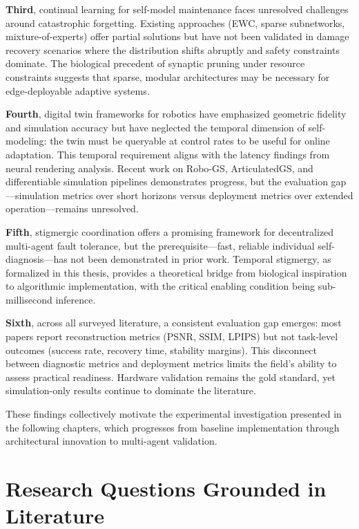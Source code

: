 \documentclass[12pt,a4paper,oneside]{report}
\begin{document}
\textbf{Third}, continual learning for self-model maintenance faces unresolved challenges around catastrophic forgetting. Existing approaches (EWC, sparse subnetworks, mixture-of-experts) offer partial solutions but have not been validated in damage recovery scenarios where the distribution shifts abruptly and safety constraints dominate. The biological precedent of synaptic pruning under resource constraints suggests that sparse, modular architectures may be necessary for edge-deployable adaptive systems.

\textbf{Fourth}, digital twin frameworks for robotics have emphasized geometric fidelity and simulation accuracy but have neglected the temporal dimension of self-modeling: the twin must be queryable at control rates to be useful for online adaptation. This temporal requirement aligns with the latency findings from neural rendering analysis. Recent work on Robo-GS, ArticulatedGS, and differentiable simulation pipelines demonstrates progress, but the evaluation gap---simulation metrics over short horizons versus deployment metrics over extended operation---remains unresolved.

\textbf{Fifth}, stigmergic coordination offers a promising framework for decentralized multi-agent fault tolerance, but the prerequisite---fast, reliable individual self-diagnosis---has not been demonstrated in prior work. Temporal stigmergy, as formalized in this thesis, provides a theoretical bridge from biological inspiration to algorithmic implementation, with the critical enabling condition being sub-millisecond inference.

\textbf{Sixth}, across all surveyed literature, a consistent evaluation gap emerges: most papers report reconstruction metrics (PSNR, SSIM, LPIPS) but not task-level outcomes (success rate, recovery time, stability margins). This disconnect between diagnostic metrics and deployment metrics limits the field's ability to assess practical readiness. Hardware validation remains the gold standard, yet simulation-only results continue to dominate the literature.

These findings collectively motivate the experimental investigation presented in the following chapters, which progresses from baseline implementation through architectural innovation to multi-agent validation.

\section{Research Questions Grounded in Literature}
\end{document}
